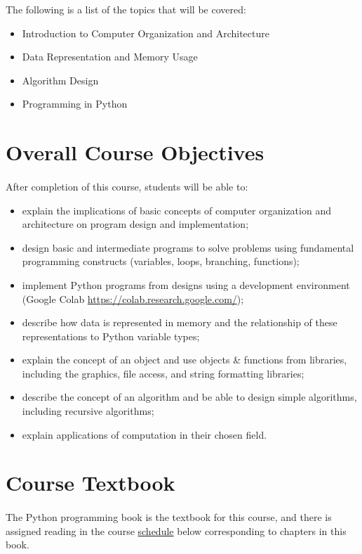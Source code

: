 \documentclass[letter,10pt]{article}
\begin{document}
The following is a list of the topics that will be covered:
\begin{itemize}
\item Introduction to Computer Organization and Architecture
\item Data Representation and Memory Usage
\item Algorithm Design
\item Programming in Python
\end{itemize}

\section*{Overall Course Objectives}
\paragraph{}After completion of this course, students will be able to:
\begin{itemize}
    \item explain the implications of basic concepts of computer organization and architecture on program design and implementation;
    \item design basic and intermediate programs to solve problems using fundamental programming constructs (variables, loops, branching, functions);
    \item implement Python programs from designs using a development environment (Google Colab \url{https://colab.research.google.com/});
    \item describe how data is represented in memory and the relationship of these representations to Python variable types;
    \item explain the concept of an object and use objects \& functions from libraries, including the graphics, file access, and string formatting libraries;
    \item describe the concept of an algorithm and be able to design simple algorithms, including recursive algorithms;
    \item explain applications of computation in their chosen field.
\end{itemize}

\section*{Course Textbook}
\paragraph{}The Python programming book is the textbook for this course, and there is assigned reading in the course \hyperlink{sec:sechedule}{schedule} below corresponding to chapters in this book.
\end{document}
